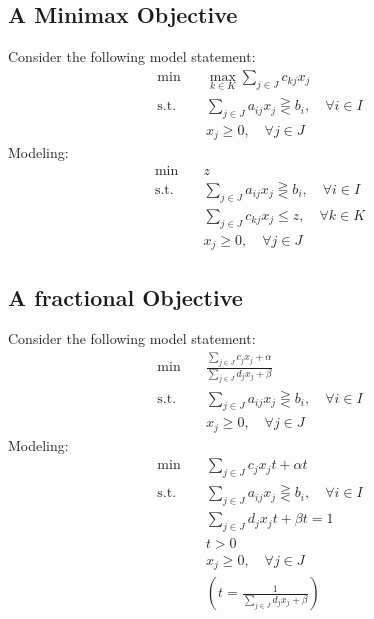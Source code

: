 			\subsection{A Minimax Objective}
				Consider the following model statement:
				\begin{align}
					\min \quad & \max_{k\in K}\sum_{j\in J}c_{kj}x_j \\
					\text{s.t.} \quad & \sum_{j\in J}a_{ij}x_j \gtreqless b_i, \quad \forall i\in I \\
					                  & x_j \ge 0, \quad \forall j\in J 
				\end{align}
				Modeling:
				\begin{align}
					\min \quad & z \\
					\text{s.t.} \quad & \sum_{j\in J}a_{ij}x_j \gtreqless b_i, \quad \forall i\in I \\
									  & \sum_{j\in J}c_{kj}x_j \le z, \quad \forall k\in K \\
					                  & x_j \ge 0, \quad \forall j\in J 
				\end{align}
			\subsection{A fractional Objective}
				Consider the following model statement:
				\begin{align}
					\min \quad & \frac{\sum_{j\in J}c_{j}x_j + \alpha}{\sum_{j\in J}d_{j}x_j + \beta} \\
					\text{s.t.} \quad & \sum_{j\in J}a_{ij}x_j \gtreqless b_i, \quad \forall i\in I \\
					                  & x_j \ge 0, \quad \forall j\in J 
				\end{align}
				Modeling:
				\begin{align}
					\min \quad & \sum_{j\in J}c_{j}x_jt + \alpha t \\
					\text{s.t.} \quad & \sum_{j\in J}a_{ij}x_j \gtreqless b_i, \quad \forall i\in I \\
									  & \sum_{j\in J}d_jx_jt + \beta t = 1\\
									  & t > 0 \\
					                  & x_j \ge 0, \quad \forall j\in J \\
					                  & (t = \frac1{\sum_{j\in J}d_jx_j + \beta}) 
				\end{align}
